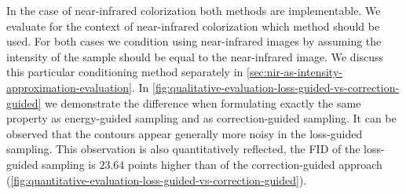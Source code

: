 In the case of near-infrared colorization both methods are implementable.
We evaluate for the context of near-infrared colorization which method should be used.
For both cases we condition using near-infrared images by assuming the intensity of the sample should be equal to the near-infrared image.
We discuss this particular conditioning method separately in \autoref{sec:nir-as-intensity-approximation-evaluation}.
In \autoref{fig:qualitative-evaluation-loss-guided-vs-correction-guided} we demonstrate the difference when formulating exactly the same property as energy-guided sampling and as correction-guided sampling.
It can be observed that the contours appear generally more noisy in the loss-guided sampling.
This observation is also quantitatively reflected, the FID of the loss-guided sampling is $23.64$ points higher than of the correction-guided approach (\autoref{fig:quantitative-evaluation-loss-guided-vs-correction-guided}).

